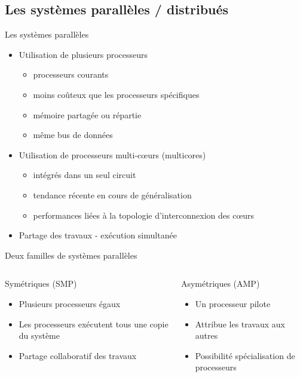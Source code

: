 \subsection{Les systèmes parallèles / distribués}
\begin{frame}{Les systèmes parallèles}
\begin{itemize}
\item Utilisation de plusieurs processeurs
\begin{itemize}
\item processeurs courants
\item moins coûteux que les processeurs spécifiques
\item mémoire partagée ou répartie
\item même bus de données
\end{itemize}
\item Utilisation de processeurs multi-cœurs (multicores)
\begin{itemize}
\item intégrés dans un seul circuit
\item tendance récente en cours de généralisation
\item performances liées à la topologie d'interconnexion des cœurs
\end{itemize}
\item Partage des travaux - exécution simultanée
\end{itemize}
\end{frame}

\begin{frame}{Deux familles de systèmes parallèles}
\begin{columns}
\begin{block}{Symétriques (SMP)}
\begin{itemize}
\item Plusieurs processeurs égaux
\item Les processeurs exécutent tous une copie du système
\item Partage collaboratif des travaux
\end{itemize}
\end{block}
\begin{block}{Asymétriques (AMP)}
\begin{itemize}
\item Un processeur pilote
\item Attribue les travaux aux autres
\item Possibilité spécialisation de processeurs
\end{itemize}
\end{block}
\end{columns}
\end{frame}

